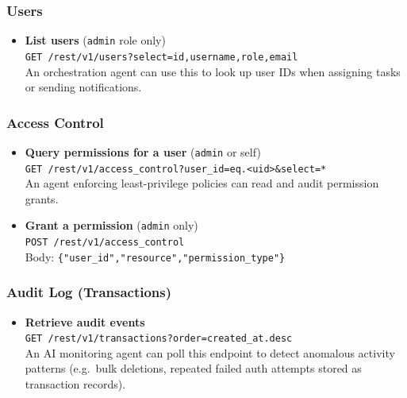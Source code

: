 \documentclass{article}
\begin{document}
\subsubsection{Users}

\begin{itemize}
    \item \textbf{List users} (\texttt{admin} role only)\\
          \texttt{GET /rest/v1/users?select=id,username,role,email}\\
          An orchestration agent can use this to look up user IDs when
          assigning tasks or sending notifications.
\end{itemize}

\subsubsection{Access Control}

\begin{itemize}
    \item \textbf{Query permissions for a user} (\texttt{admin} or self)\\
          \texttt{GET /rest/v1/access\_control?user\_id=eq.<uid>\&select=*}\\
          An agent enforcing least-privilege policies can read and audit
          permission grants.

    \item \textbf{Grant a permission} (\texttt{admin} only)\\
          \texttt{POST /rest/v1/access\_control}\\
          Body: \texttt{\{"user\_id","resource","permission\_type"\}}
\end{itemize}

\subsubsection{Audit Log (Transactions)}

\begin{itemize}
    \item \textbf{Retrieve audit events}\\
          \texttt{GET /rest/v1/transactions?order=created\_at.desc}\\
          An AI monitoring agent can poll this endpoint to detect
          anomalous activity patterns (e.g.\ bulk deletions, repeated
          failed auth attempts stored as transaction records).
\end{itemize}
\end{document}
